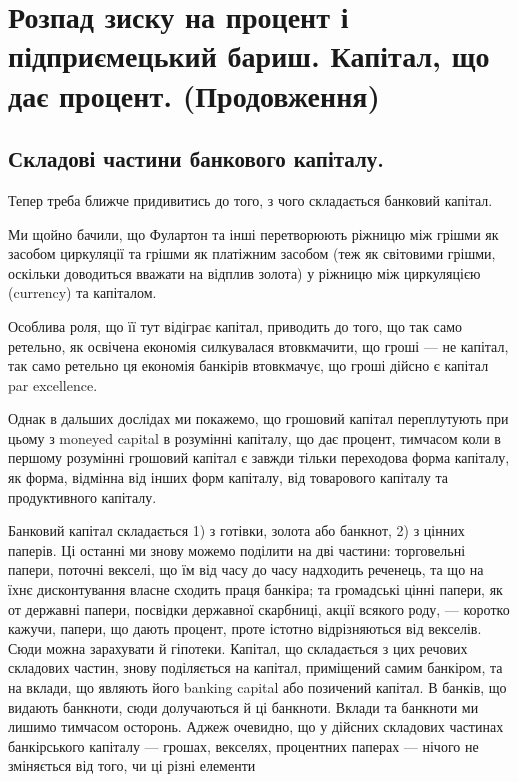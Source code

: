 
\chapter{Розпад зиску на процент і підприємецький бариш. Капітал, що дає процент. (Продовження)}

\section{Складові частини банкового капіталу.}

Тепер треба ближче придивитись до того, з чого складається банковий
капітал.

Ми щойно бачили, що Фулартон та інші перетворюють ріжницю між грішми
як засобом циркуляції та грішми як платіжним засобом (теж як світовими
грішми, оскільки доводиться вважати на відплив золота) у ріжницю між циркуляцією
(currency) та капіталом.

Особлива роля, що її тут відіграє капітал, приводить до того, що так само
ретельно, як освічена економія силкувалася втовкмачити, що гроші — не капітал,
так само ретельно ця економія банкірів втовкмачує, що гроші дійсно є капітал
par excellence.

Однак в дальших дослідах ми покажемо, що грошовий капітал переплутують
при цьому з moneyed capital в розумінні капіталу, що дає процент,
тимчасом коли в першому розумінні грошовий капітал є завжди тільки переходова
форма капіталу, як форма, відмінна від інших форм капіталу, від
товарового капіталу та продуктивного капіталу.

Банковий капітал складається 1) з готівки, золота або банкнот, 2) з
цінних паперів. Ці останні ми знову можемо поділити на дві частини: торговельні
папери, поточні векселі, що їм від часу до часу надходить реченець, та
що на їхнє дисконтування власне сходить праця банкіра; та громадські
цінні папери, як от державні папери, посвідки державної скарбниці, акції
всякого роду, — коротко кажучи, папери, що дають процент, проте істотно відрізняються
від векселів. Сюди можна зарахувати й гіпотеки. Капітал, що складається
з цих речових складових частин, знову поділяється на капітал, приміщений
самим банкіром, та на вклади, що являють його banking capital або
позичений капітал. В банків, що видають банкноти, сюди долучаються й ці
банкноти. Вклади та банкноти ми лишимо тимчасом осторонь. Аджеж очевидно,
що у дійсних складових частинах банкірського капіталу — грошах, векселях,
процентних паперах — нічого не зміняється від того, чи ці різні елементи
\parbreak{}  %
